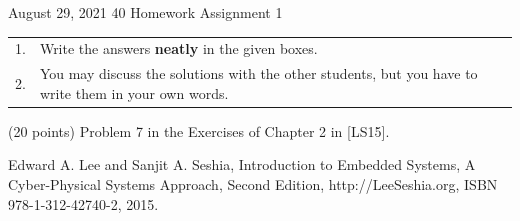 \documentclass[a4paper, 12pt]{article}
\begin{document}
\vspace*{14ex}

           {August 29, 2021}      					         		%
					 {40}											%
					 {Homework Assignment 1}							%
					
\begin{tabular}{cl}
1. & Write the answers \textbf{neatly} in the given boxes.\\
2. & You may  discuss the solutions with the other students, but you have to write them in your own words.
\end{tabular}


\begin{problem}{}
(20 points) Problem 7 in the Exercises of Chapter 2 in [LS15]. 

\noindent
[LS15] Edward A. Lee and Sanjit A. Seshia, Introduction to Embedded Systems, A Cyber-Physical Systems Approach, Second Edition, http://LeeSeshia.org, ISBN 978-1-312-42740-2, 2015. \\
\\
\begin{minipage}{1\textwidth}
		\rectangle{\linewidth}{20cm}
\end{minipage}
\newpage
\ \\
\begin{minipage}{1\textwidth}
		\rectangle{\linewidth}{24cm}
\end{minipage}
\newpage
\ \\
\begin{minipage}{1\textwidth}
		\rectangle{\linewidth}{24cm}
\end{minipage}
\newpage
\ \\
\begin{minipage}{1\textwidth}
		\rectangle{\linewidth}{24cm}
\end{minipage}
\end{problem}
\end{document}
